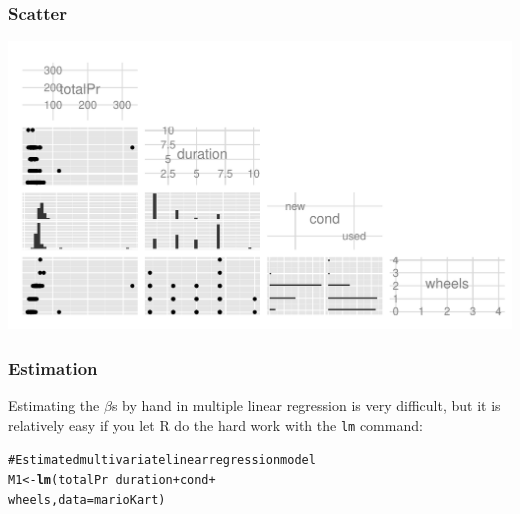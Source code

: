\documentclass{beamer}\usepackage{graphicx, color}
\makeatletter
\def\maxwidth{ %
  \ifdim\Gin@nat@width>\linewidth
    \linewidth
  \else
    \Gin@nat@width
  \fi
}
\newcommand{\hlfunctioncall}[1]{\textcolor[rgb]{0.501960784313725,0,0.329411764705882}{\textbf{#1}}}%
\newcommand{\hlcomment}[1]{\textcolor[rgb]{0.180392156862745,0.6,0.341176470588235}{#1}}%
\newenvironment{kframe}{%
 \def\at@end@of@kframe{}%
 \ifinner\ifhmode%
  \def\at@end@of@kframe{\end{minipage}}%
  \begin{minipage}{\columnwidth}%
 \fi\fi%
 \def\FrameCommand##1{\hskip\@totalleftmargin \hskip-\fboxsep
 \colorbox{shadecolor}{##1}\hskip-\fboxsep
     \hskip-\linewidth \hskip-\@totalleftmargin \hskip\columnwidth}%
 \MakeFramed {\advance\hsize-\width
   \@totalleftmargin\z@ \linewidth\hsize
   \@setminipage}}%
 {\par\unskip\endMakeFramed%
 \at@end@of@kframe}
\newenvironment{knitrout}{}{} %
\makeatother
\begin{document}
\begin{frame}[fragile]
  \frametitle{Scatter}
\begin{knitrout}
\color{fgcolor}

{\centering \includegraphics[width=\maxwidth]{figure/Scatter} 

}


\end{knitrout}

\end{frame}


\begin{frame}[fragile]
  \frametitle{Estimation}
  Estimating the $\beta$s by hand in multiple linear regression is very difficult, but it is relatively easy if you let R do the hard work with the \texttt{lm} command:
\begin{knitrout}
\color{fgcolor}\begin{kframe}
\begin{alltt}
\hlcomment{# Estimated multivariate linear regression model}
M1 <- \hlfunctioncall{lm}(totalPr ~ duration + cond + 
           wheels, data = marioKart)
\end{alltt}
\end{kframe}
\end{knitrout}

\end{frame}
\end{document}

